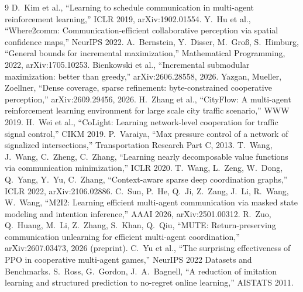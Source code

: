 \documentclass[11pt]{article}
\theoremstyle{definition}
\begin{document}
\begin{thebibliography}{9}
 D.~Kim et al., ``Learning to schedule communication in multi-agent reinforcement
learning,'' ICLR 2019, arXiv:1902.01554.
 Y.~Hu et al., ``Where2comm: Communication-efficient collaborative perception via
spatial confidence maps,'' NeurIPS 2022.
 A.~Bernstein, Y.~Disser, M.~Gro{\ss}, S.~Himburg, ``General bounds for
incremental maximization,'' Mathematical Programming, 2022, arXiv:1705.10253.
 Bienkowski et al., ``Incremental submodular maximization: better than
greedy,'' arXiv:2606.28558, 2026.
 Yazgan, Mueller, Zoellner, ``Dense coverage, sparse refinement: byte-constrained
cooperative perception,'' arXiv:2609.29456, 2026.
 H.~Zhang et al., ``CityFlow: A multi-agent reinforcement learning environment for
large scale city traffic scenario,'' WWW 2019.
 H.~Wei et al., ``CoLight: Learning network-level cooperation for traffic signal
control,'' CIKM 2019.
 P.~Varaiya, ``Max pressure control of a network of signalized intersections,''
Transportation Research Part C, 2013.
 T.~Wang, J.~Wang, C.~Zheng, C.~Zhang, ``Learning nearly decomposable value functions via
communication minimization,'' ICLR 2020.
 T.~Wang, L.~Zeng, W.~Dong, Q.~Yang, Y.~Yu, C.~Zhang, ``Context-aware sparse deep coordination
graphs,'' ICLR 2022, arXiv:2106.02886.
 C.~Sun, P.~He, Q.~Ji, Z.~Zang, J.~Li, R.~Wang, W.~Wang, ``M2I2: Learning efficient multi-agent
communication via masked state modeling and intention inference,'' AAAI 2026, arXiv:2501.00312.
 R.~Zuo, Q.~Huang, M.~Li, Z.~Zhang, S.~Khan, Q.~Qiu, ``MUTE: Return-preserving communication
unlearning for efficient multi-agent coordination,'' arXiv:2607.03473, 2026 (preprint).
 C.~Yu et al., ``The surprising effectiveness of PPO in cooperative multi-agent games,''
NeurIPS 2022 Datasets and Benchmarks.
 S.~Ross, G.~Gordon, J.~A.~Bagnell, ``A reduction of imitation learning and structured
prediction to no-regret online learning,'' AISTATS 2011.
\end{thebibliography}
\end{document}
